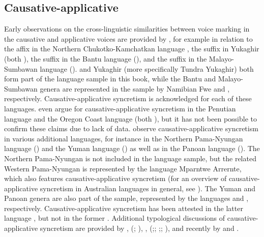 \subsection{Causative-applicative} \label{sec:simple-syncretism:caus-appl}
Early observations on the cross-linguistic similarities between voice marking in the causative and applicative voices are provided by \citet[36f.]{nedjalkov:silnickij:1969}, for example in relation to the affix  in the Northern Chukotko-Kamchatkan language , the suffix  in Yukaghir (both ), the suffix  in the Bantu language  (), and the suffix  in the Malayo-Sumbawan language  ().  and Yukaghir (more specifically Tundra Yukaghir) both form part of the language sample in this book, while the Bantu and Malayo-Sumbawan genera are represented in the sample by Namibian Fwe and , respectively. Causative-applicative syncretism is acknowledged for each of these languages. \citeauthor{nedjalkov:silnickij:1969} even argue for causative-applicative syncretism in the Penutian language  and the Oregon Coast language  (both ), but it has not been possible to confirm these claims due to lack of data. \citet[116ff.]{shibatani:pardeshi:2002} observe cau\-sa\-tive-ap\-pli\-ca\-tive syncretism in various additional languages, for instance in the Northern Pama-Nyungan language  () and the Yuman language  () as well as in the Panoan language  (). The Northern Pama-Nyungan  is not included in the language sample, but the related Western Pama-Nyungan  is represented by the language Mparntwe Arrernte, which also features causative-applicative syncretism (for an overview of causative-applicative syncretism in Australian languages in general, see \citealt{austin:2005}). The Yuman and Panoan genera are also part of the sample, represented by the languages  and , respectively. Causative-applicative syncretism has been attested in the latter language \citep{tallman:2018}, but not in the former \citep{miller:a:2001}. Additional typological discussions of causative-applicative syncretism are provided by \citet[183]{comrie:1989}, \citeauthor{kulikov:2001} (\citeyear[984]{kulikov:2001}; \citeyear[394]{kulikov:2010}), \citet[1139]{haspelmath:muller-bardey:2004}, \citeauthor{malchukov:2015} (\citeyear[115f.]{malchukov:2015};; \citeyear[403ff.]{malchukov:2016};; \citeyear[6ff., 9ff.]{malchukov:2017}), and recently by \citet[234ff.]{zuniga:kittila:2019} and \citet{franco:2019}.

